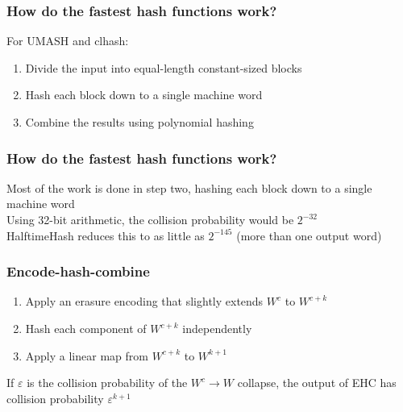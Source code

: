 \documentclass[xcolor=dvipsnames]{beamer}
\begin{document}
\begin{frame}
  \frametitle{How do the fastest hash functions work?}

  For UMASH and clhash:
  \pause
  $ $\\
  \begin{enumerate}
  \item Divide the input into equal-length constant-sized blocks
    \pause
  \item Hash each block down to a single machine word
    \pause
    \item Combine the results using polynomial hashing
  \end{enumerate}
\end{frame}

\begin{frame}
  \frametitle{How do the fastest hash functions work?}
  Most of the work is done in step two, hashing each block down to a single machine word
  \pause \\ $ $ \\
  Using 32-bit arithmetic, the collision probability would be $2^{-32}$
  \pause \\ $ $ \\
  HalftimeHash reduces this to as little as $2^{-145}$ \pause (more than one output word)
\end{frame}




\begin{frame}
  \frametitle{Encode-hash-combine}
  \begin{enumerate}
  \item Apply an erasure encoding that slightly extends $W^c$ to $W^{c+k}$
    \pause
  \item Hash each component of $W^{c+k}$ independently
    \pause
  \item Apply a linear map from $W^{c+k}$ to $W^{k+1}$
  \end{enumerate}
  \pause
  If $\varepsilon$ is the collision probability of the $W^c \to W$ collapse, the output of EHC has collision probability $\varepsilon^{k+1}$
\end{frame}
\end{document}
